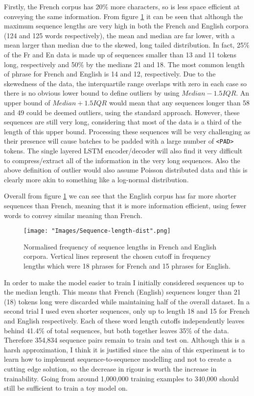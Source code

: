 \documentclass[]{article}
\begin{document}
Firstly, the French corpus has 20\% more characters, so is less space efficient at conveying the same information.
From figure \ref{fig:seq-length} it can be seen that although the maximum sequence lengths are very high in both the French and English corpora (124 and 125 words respectively), the mean and median are far lower, with a mean larger than median due to the skewed, long tailed distribution. In fact, 25\% of the Fr and En data is made up of sequences smaller than 13 and 11 tokens long, respectively and 50\% by the medians 21 and 18. The most common length of phrase for French and English is 14 and 12, respectively. Due to the skewedness of the data, the interquartile range overlaps with zero in each case so there is no obvious lower bound to define outliers by using $Median-1.5IQR$. An upper bound of $Median+1.5IQR$ would mean that any sequences longer than 58 and 49 could be deemed outliers, using the standard approach. However, these sequences are still very long, considering that most of the data is a third of the length of this upper bound. Processing these sequences will be very challenging as their presence will cause batches to be padded with a large number of \lstinline{<PAD>} tokens. The single layered LSTM encoder/decoder will also find it very difficult to compress/extract all of the information in the very long sequences. Also the above definition of outlier would also assume Poisson distributed data and this is clearly more akin to something like a log-normal distribution.

Overall from figure \ref{fig:seq-length} we can see that the English corpus has far more shorter sequences than French, meaning that it is more information efficient, using fewer words to convey similar meaning than French.
\begin{figure}[t]	\centering
	\texttt{[image: "Images/Sequence-length-dist".png]}
	\caption{Normalised frequency of sequence lengths in French and English corpora. Vertical lines represent the chosen cutoff in frequency lengths which were 18 phrases for French and 15 phrases for English.}
	\label{fig:seq-length}
\end{figure}
In order to make the model easier to train I initially considered sequences up to the median length. This means that French (English) sequences longer than 21 (18) tokens long were discarded while maintaining half of the overall dataset. In a second trial I used even shorter sequences, only up to length 18 and 15 for French and English respectively. Each of these word length cutoffs independently leaves behind 41.4\% of total sequences, but both together leaves 35\% of the data. Therefore 354,834 sequence pairs remain to train and test on. Although this is a harsh approximation, I think it is justified since the aim of this experiment is to learn how to implement sequence-to-sequence modelling and not to create a cutting edge solution, so the decrease in rigour is worth the increase in trainability. Going from around 1,000,000 training examples to 340,000 should still be sufficient to train a toy model on.
\end{document}
